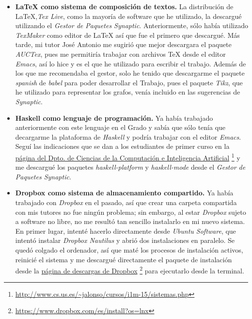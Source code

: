 \begin{itemize}
  \item \textbf{\LaTeX{} como sistema de composición de textos.} La distribución de 
    \LaTeX{},\textit{Tex Live}, como la mayoría de software que he utilizado, la 
    descargué utilizando el \textit{Gestor de Paquetes Synaptic}. Anteriormente, sólo 
    había utilizado  \textit{TexMaker} como editor de \LaTeX{} así que fue el primero
    que descargué. Más tarde, mi tutor José Antonio me sugirió que mejor descargara  
    el paquete \textit{AUCTex}, pues me  permitiría trabajar con archivos \TeX{} 
    desde el editor \textit{Emacs}, así lo hice y es el que he utilizado para escribir
    el trabajo. Además de los que me recomendaba el gestor, solo he tenido que 
    descargarme el paquete \textit{spanish} de \textit{babel} para poder desarrollar el 
    Trabajo, pues el paquete \textit{Tikz}, que he utilizado para representar los grafos,
    venía incluido en las sugerencias de \textit{Synaptic}.

  \item \textbf{Haskell como lenguaje de programación.} Ya había trabajado anteriormente
    con este lenguaje en el Grado y sabía que sólo tenía que decargarme la plataforma
    de  \textit{Haskell} y podría trabajar con el editor \textit{Emacs}. Seguí las
    indicaciones que se dan a los estudiantes de primer curso en la 
    \href{http://www.cs.us.es/~jalonso/cursos/i1m-15/sistemas.php}
    {página del Dpto. de Ciencias de la Computación e Inteligencia Artificial}
    \footnote{\url{http://www.cs.us.es/~jalonso/cursos/i1m-15/sistemas.php}}
    y me descargué los paquetes \textit{haskell-platform} y \textit{haskell-mode} desde
    el \textit{Gestor de Paquetes Synaptic}.


  \item \textbf{Dropbox como sistema de almacenamiento compartido.} Ya había trabajado
    con \textit{Dropbox} en el pasado, así que crear una carpeta compartida con mis
    tutores no fue ningún problema; sin embargo, al estar \textit{Dropbox} sujeto a 
    software no libre, no me resultó tan sencillo instalarlo en mi nuevo sistema. En 
    primer lugar, intenté hacerlo directamente desde \textit{Ubuntu Software}, que
    intentó instalar \textit{Dropbox Nautilus} y abrió dos instalaciones en paralelo.
    Se quedó colgado el ordenador, así que maté los procesos de instalación 
    activos, reinicié el sistema y me descargué directamente el paquete de instalación
    desde la 
    \href{https://www.dropbox.com/es/install?os=lnx}
    {página de descargas de Dropbox}
    \footnote{\url{https://www.dropbox.com/es/install?os=lnx}} para ejecutarlo desde la 
    terminal.
\end{itemize}

